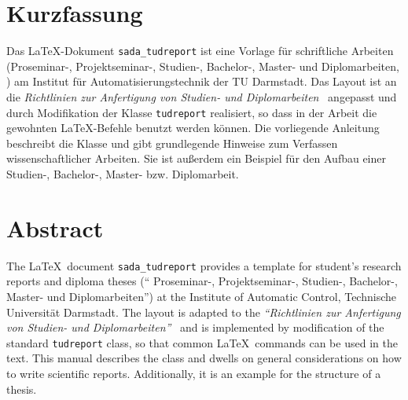 \section*{Kurzfassung}
Das \LaTeX-Dokument \verb|sada_tudreport| ist eine Vorlage für schriftliche Arbeiten (Proseminar-, Projektseminar-, Studien-, Bachelor-, Master- und Diplomarbeiten, \etc) am Institut für Automatisierungstechnik der TU Darmstadt. Das
Layout ist an die \emph{Richtlinien zur Anfertigung von Studien- und
Diplomarbeiten}~\cite{Richtlinien} angepasst und durch Modifikation der Klasse \verb|tudreport|
realisiert, so dass in der Arbeit die gewohnten \LaTeX-Befehle benutzt werden
können. Die vorliegende Anleitung beschreibt die Klasse und gibt grundlegende
Hinweise zum Verfassen wissenschaftlicher Arbeiten. Sie ist außerdem ein
Beispiel für den Aufbau einer Studien-, Bachelor-, Master- bzw. Diplomarbeit.




\section*{Abstract}
The \LaTeX\ document \verb|sada_tudreport| provides a template for student's research
reports and diploma theses (`` Proseminar-, Projektseminar-, Studien-, Bachelor-, Master- und Diplomarbeiten'') at the Institute of
Automatic Control, Technische Universität Darmstadt. The layout is adapted to
the \emph{``Richtlinien zur Anfertigung von Studien- und
Diplomarbeiten''}~\cite{Richtlinien} and is implemented by modification of the standard \verb|tudreport|
class, so that common \LaTeX\ commands can be used in the text. This manual
describes the class and dwells on general considerations on how to write
scientific reports. Additionally, it is an example for the structure of a
thesis.


